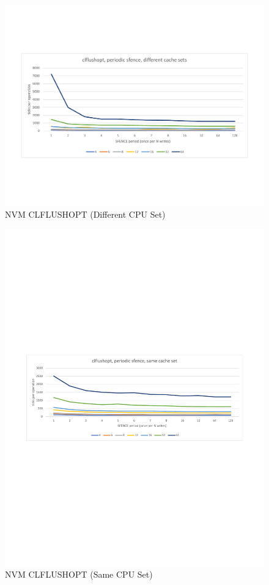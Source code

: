 \begin{figure}
    \centering
    \caption{NVM CLFLUSHOPT (Different CPU Set)}\label{micro:clflushopt:different}
    \includegraphics[scale=0.35]{micro/nvm-clflushopt-periodic-different.pdf}
\end{figure}

\begin{figure}
    \centering
    \caption{NVM CLFLUSHOPT (Same CPU Set)}\label{micro:clflushopt:same}
    \includegraphics[scale=0.35]{micro/nvm-clflushopt-periodic-same.pdf}
\end{figure}

